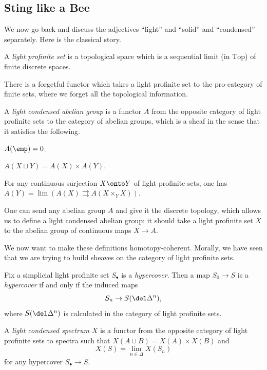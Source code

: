\documentclass[../notes.tex]{subfiles}
\begin{document}
\subsection{Sting like a Bee}
We now go back and discuss the adjectives ``light'' and ``solid'' and ``condensed'' separately. Here is the classical story.
\begin{definition}[light]
	A \textit{light profinite set} is a topological space which is a sequential limit (in $\mathrm{Top}$) of finite discrete spaces.
\end{definition}
\begin{remark}
	There is a forgetful functor which takes a light profinite set to the pro-category of finite sets, where we forget all the topological information.
\end{remark}
\begin{definition}[condensed]
	A \textit{light condensed abelian group} is a functor $A$ from the opposite category of light profinite sets to the category of abelian groups, which is a sheaf in the sense that it satisfies the following.
	\begin{listalph}
		\item $A(\emp)=0$.
		\item $A(X\sqcup Y)=A(X)\times A(Y)$.
		\item For any continuous surjection $X\onto Y$ of light profinite sets, one has $A(Y)=\lim(A(X)\rightrightarrows A(X\times_YX))$.
	\end{listalph}
\end{definition}
\begin{example}
	One can send any abelian group $A$ and give it the discrete topology, which allows us to define a light condensed abelian group: it should take a light profinite set $X$ to the abelian group of continuous maps $X\to A$.
\end{example}
We now want to make these definitions homotopy-coherent. Morally, we have seen that we are trying to build sheaves on the category of light profinite sets.
\begin{definition}[hypercover]
	Fix a simplicial light profinite set $S_\bullet$ is a \textit{hypercover}. Then a map $S_0\to S$ is a \textit{hypercover} if and only if the induced maps
	\[S_n\to S(\del\Delta^n),\]
	where $S(\del\Delta^n)$ is calculated in the category of light profinite sets.
\end{definition}
\begin{definition}[condensed]
	A \textit{light condensed spectrum} $X$ is a functor from the opposite category of light profinite sets to spectra such that $X(A\sqcup B)=X(A)\times X(B)$ and
	\[X(S)=\lim_{n\in\Delta}X(S_n)\]
	for any hypercover $S_\bullet\to S$.
\end{definition}
\end{document}
